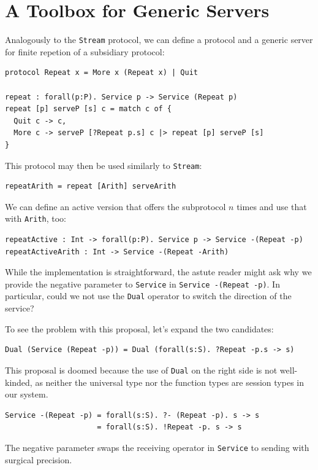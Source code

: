 \section{A Toolbox for Generic Servers}
\label{sec:toolb-gener-serv-1}


Analogously to the \lstinline+Stream+ protocol, we can define a protocol
and a generic server for finite repetion of a subsidiary protocol:
\begin{lstlisting}
protocol Repeat x = More x (Repeat x) | Quit

repeat : forall(p:P). Service p -> Service (Repeat p)
repeat [p] serveP [s] c = match c of {
  Quit c -> c,
  More c -> serveP [?Repeat p.s] c |> repeat [p] serveP [s]
}
\end{lstlisting}
This protocol may then be used similarly to  \lstinline+Stream+:
\begin{lstlisting}
repeatArith = repeat [Arith] serveArith
\end{lstlisting}
We can define an active version that offers the subprotocol $n$ times
and use that with \lstinline+Arith+, too:
\begin{lstlisting}
repeatActive : Int -> forall(p:P). Service p -> Service -(Repeat -p)
repeatActiveArith : Int -> Service -(Repeat -Arith)
\end{lstlisting}
While the implementation is straightforward, the astute reader might
ask why we provide the negative parameter to \lstinline+Service+ in
\lstinline+Service -(Repeat -p)+. In particular, could we not use the
\lstinline+Dual+ operator to switch the direction of the service?

To see the problem with this proposal, let's expand the two candidates:
\begin{lstlisting}
Dual (Service (Repeat -p)) = Dual (forall(s:S). ?Repeat -p.s -> s)
\end{lstlisting}
This proposal is doomed because the use of \lstinline+Dual+ on the
right side is not well-kinded, as neither the
universal type nor the function types are session types in our
system.

\begin{lstlisting}
Service -(Repeat -p) = forall(s:S). ?- (Repeat -p). s -> s
                     = forall(s:S). !Repeat -p. s -> s
\end{lstlisting}
The negative parameter swaps the receiving operator in
\lstinline+Service+ to sending with surgical precision.


